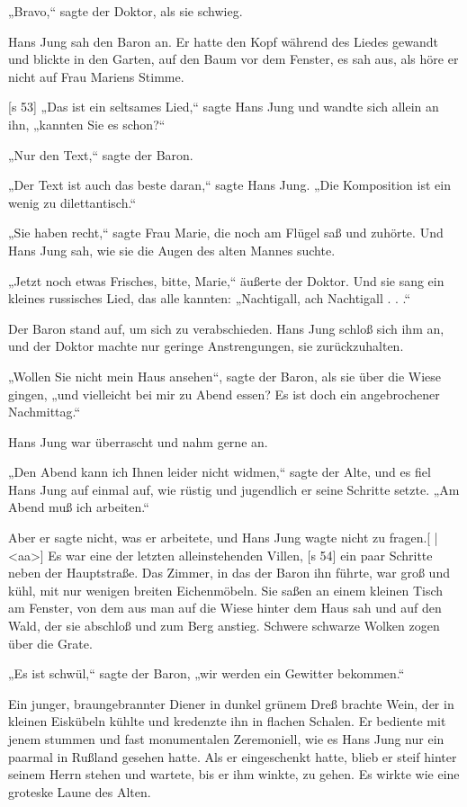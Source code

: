 „Bravo,“ sagte der Doktor, als sie schwieg.

Hans Jung sah den Baron an. Er hatte den
Kopf während des Liedes gewandt und blickte in
den Garten, auf den Baum vor dem Fenster, es sah
aus, als höre er nicht auf Frau Mariens Stimme.

[s 53]
„Das ist ein seltsames Lied,“ sagte Hans Jung
und wandte sich allein an ihn, „kannten Sie es schon?“

„Nur den Text,“ sagte der Baron.

„Der Text ist auch das beste daran,“ sagte Hans
Jung. „Die Komposition ist ein wenig zu dilettantisch.“

„Sie haben recht,“ sagte Frau Marie, die noch
am Flügel saß und zuhörte. Und Hans Jung sah,
wie sie die Augen des alten Mannes suchte.

„Jetzt noch etwas Frisches, bitte, Marie,“ äußerte
der Doktor. Und sie sang ein kleines russisches Lied,
das alle kannten: „Nachtigall, ach Nachtigall . . .“

Der Baron stand auf, um sich zu verabschieden.
Hans Jung schloß sich ihm an, und der Doktor machte
nur geringe Anstrengungen, sie zurückzuhalten.

„Wollen Sie nicht mein Haus ansehen“, sagte
der Baron, als sie über die Wiese gingen, „und
vielleicht bei mir zu Abend essen? Es ist doch ein
angebrochener Nachmittag.“

Hans Jung war überrascht und nahm gerne an.

„Den Abend kann ich Ihnen leider nicht widmen,“
sagte der Alte, und es fiel Hans Jung auf einmal auf,
wie rüstig und jugendlich er seine Schritte setzte.
„Am Abend muß ich arbeiten.“

Aber er sagte nicht, was er arbeitete, und Hans
Jung wagte nicht zu fragen.[
|
<aa>]
Es war eine der letzten alleinstehenden Villen,
[s 54]
ein paar Schritte neben der Hauptstraße. Das Zimmer,
in das der Baron ihn führte, war groß und kühl,
mit nur wenigen breiten Eichenmöbeln. Sie saßen
an einem kleinen Tisch am Fenster, von dem aus
man auf die Wiese hinter dem Haus sah und auf
den Wald, der sie abschloß und zum Berg anstieg.
Schwere schwarze Wolken zogen über die Grate.

„Es ist schwül,“ sagte der Baron, „wir werden
ein Gewitter bekommen.“

Ein junger, braungebrannter Diener in dunkel­
grünem Dreß brachte Wein, der in kleinen Eiskübeln
kühlte und kredenzte ihn in flachen Schalen. Er
bediente mit jenem stummen und fast monumentalen
Zeremoniell, wie es Hans Jung nur ein paarmal in
Rußland gesehen hatte. Als er eingeschenkt hatte,
blieb er steif hinter seinem Herrn stehen und wartete,
bis er ihm winkte, zu gehen. Es wirkte wie eine
groteske Laune des Alten.

